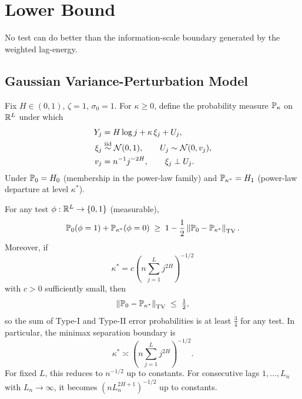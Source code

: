 \section{Lower Bound}
\label{sec:lower}

No test can do better than the information-scale boundary generated by the
weighted lag-energy.

\subsection{Gaussian Variance-Perturbation Model}

Fix $H \in (0,1)$, $\zeta = 1$, $\sigma_0 = 1$.  For $\kappa \geq 0$,
define the probability measure $\mathbb{P}_\kappa$ on $\mathbb{R}^L$ under which
\begin{align*}
    Y_j &= H\log j + \kappa\,\xi_j + U_j,\\
    \xi_j &\overset{\text{iid}}{\sim} \mathcal{N}(0,1), \qquad U_j \sim \mathcal{N}(0, v_j),\\
    v_j &= n^{-1} j^{-2H}, \qquad \xi_j \perp U_j.
\end{align*}
Under $\mathbb{P}_0 = H_0$ (membership in the power-law family) and
$\mathbb{P}_{\kappa^*} = H_1$ (power-law departure at level $\kappa^*$).

\begin{theorem}
\label{thm:lecam-lower}
For any test $\phi: \mathbb{R}^L \to \{0,1\}$ (measurable),
\[
    \mathbb{P}_0(\phi = 1) + \mathbb{P}_{\kappa^*}(\phi = 0)
    \;\geq\;
    1 - \frac{1}{2}\left\|\mathbb{P}_0 - \mathbb{P}_{\kappa^*}\right\|_{\mathrm{TV}}.
\]
Moreover, if
\[
    \kappa^* = c\left(n\sum_{j=1}^L j^{2H}\right)^{-1/2}
\]
with $c > 0$ sufficiently small, then
\[
    \left\|\mathbb{P}_0 - \mathbb{P}_{\kappa^*}\right\|_{\mathrm{TV}} \;\leq\; \tfrac{1}{2},
\]
so the sum of Type-I and Type-II error probabilities is at least $\frac{3}{4}$
for any test.  In particular, the minimax separation boundary is
\[
    \kappa^* \asymp \left(n\sum_{j=1}^L j^{2H}\right)^{-1/2}.
\]
For fixed $L$, this reduces to $n^{-1/2}$ up to constants.  For consecutive
lags $1,\dots,L_n$ with $L_n \to \infty$, it becomes
$(nL_n^{2H+1})^{-1/2}$ up to constants.
\end{theorem}

